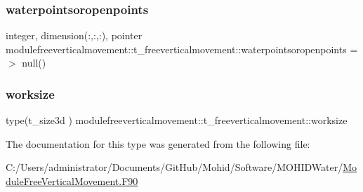 \subsubsection{\texorpdfstring{waterpointsoropenpoints}{waterpointsoropenpoints}}
{\footnotesize\ttfamily integer, dimension(\+:,\+:,\+:), pointer modulefreeverticalmovement\+::t\+\_\+freeverticalmovement\+::waterpointsoropenpoints =$>$ null()\hspace{0.3cm}{\ttfamily [private]}}

\mbox{\label{structmodulefreeverticalmovement_1_1t__freeverticalmovement_af55d0f66b3891be359747ecc179aafcc}} 
\subsubsection{\texorpdfstring{worksize}{worksize}}
{\footnotesize\ttfamily type(t\+\_\+size3d ) modulefreeverticalmovement\+::t\+\_\+freeverticalmovement\+::worksize\hspace{0.3cm}{\ttfamily [private]}}



The documentation for this type was generated from the following file\+:\begin{DoxyCompactItemize}
\item 
C\+:/\+Users/administrator/\+Documents/\+Git\+Hub/\+Mohid/\+Software/\+M\+O\+H\+I\+D\+Water/\mbox{\hyperlink{_module_free_vertical_movement_8_f90}{Module\+Free\+Vertical\+Movement.\+F90}}\end{DoxyCompactItemize}
